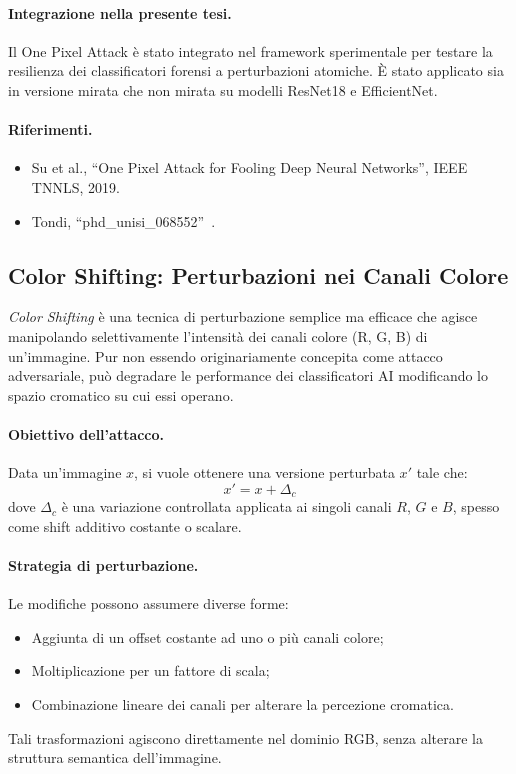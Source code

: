 \paragraph{Integrazione nella presente tesi.}
Il One Pixel Attack è stato integrato nel framework sperimentale per testare la resilienza dei classificatori forensi a perturbazioni atomiche. È stato applicato sia in versione mirata che non mirata su modelli ResNet18 e EfficientNet.

\paragraph{Riferimenti.}
\begin{itemize}
    \item Su et al., “One Pixel Attack for Fooling Deep Neural Networks”, IEEE TNNLS, 2019.
    \item Tondi, “phd\_unisi\_068552”~\cite{phd_unisi_068552}.
\end{itemize}


\subsection{Color Shifting: Perturbazioni nei Canali Colore}
\label{sec:color_shifting}

\textit{Color Shifting} è una tecnica di perturbazione semplice ma efficace che agisce manipolando selettivamente l’intensità dei canali colore (R, G, B) di un’immagine. Pur non essendo originariamente concepita come attacco adversariale, può degradare le performance dei classificatori AI modificando lo spazio cromatico su cui essi operano.

\paragraph{Obiettivo dell’attacco.}
Data un’immagine $x$, si vuole ottenere una versione perturbata $x'$ tale che:
\[
x' = x + \Delta_c
\]
dove $\Delta_c$ è una variazione controllata applicata ai singoli canali $R$, $G$ e $B$, spesso come shift additivo costante o scalare.

\paragraph{Strategia di perturbazione.}
Le modifiche possono assumere diverse forme:
\begin{itemize}
    \item Aggiunta di un offset costante ad uno o più canali colore;
    \item Moltiplicazione per un fattore di scala;
    \item Combinazione lineare dei canali per alterare la percezione cromatica.
\end{itemize}
Tali trasformazioni agiscono direttamente nel dominio RGB, senza alterare la struttura semantica dell’immagine.


